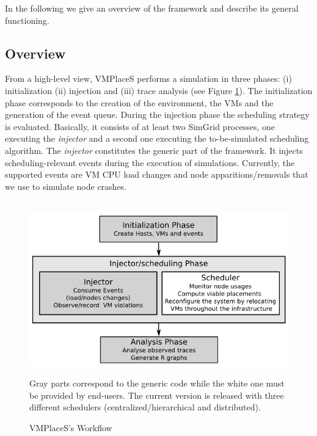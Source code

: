 \documentclass[conference]{IEEEtran}
\newcommand{\sg}{SimGrid\xspace}
\newcommand{\vmps}{VMPlaceS\xspace}
\begin{document}
In the following we give an overview of the framework and describe its
general functioning.%

\subsection{Overview}
\label{sec:overview}

From a high-level view, \vmps performs a simulation in three phases:
(i) initialization (ii) injection and (iii) trace analysis (see Figure
\ref{fig:workflow}).  The
initialization phase corresponds to the creation of the environment,
the VMs and the generation of the event queue. During the injection
phase the scheduling strategy is evaluated. Basically, it consists of
at least two \sg processes, one executing the \emph{injector} and a
second one executing the to-be-simulated scheduling algorithm.  The
\emph{injector} constitutes the generic part of the framework. It
injects scheduling-relevant events during the execution of
simulations.  Currently, the supported events are VM CPU load changes
and node apparitions/removals that we use to simulate node crashes.

\begin{figure}
  {\centering ~\includegraphics[width=.95\linewidth]{figures/VMPlaceS-workflow.png}}
  \caption{\vmps's Workflow}
  \label{fig:workflow}
{\small Gray parts correspond to the generic code while the white one
  must be provided by end-users. The current version is released with
  three different schedulers (centralized/hierarchical and distributed).}
\end{figure}

\end{document}
